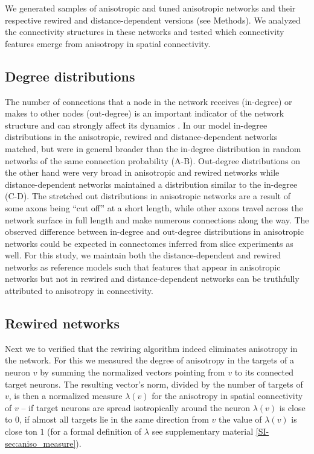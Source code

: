 
We generated samples of anisotropic and tuned anisotropic networks and
their respective rewired and distance-dependent versions (see
Methods). We analyzed the connectivity structures in these networks
and tested which connectivity features emerge from anisotropy in
spatial connectivity.

\subsection{Degree distributions}

The number of connections that a node in the network receives
(in-degree) or makes to other nodes (out-degree) is an important
indicator of the network structure and can strongly affect its
dynamics \cite{Roxin2011a, Martens2017}. In our model in-degree
distributions in the anisotropic, rewired and distance-dependent
networks matched, but were in general broader than the in-degree
distribution in random networks of the same connection probability
(A-B). Out-degree distributions on the other hand
were very broad in anisotropic and rewired networks while
distance-dependent networks maintained a distribution similar to the
in-degree (C-D). The stretched out distributions in
anisotropic networks are a result of some axons being \enquote{cut
  off} at a short length, while other axons travel across the network
surface in full length and make numerous connections along the
way. The observed difference between in-degree and out-degree
distributions in anisotropic networks could be expected in connectomes
inferred from slice experiments as well. For this study, we maintain
both the distance-dependent and rewired networks as reference models
such that features that appear in anisotropic networks but not in
rewired and distance-dependent networks can be truthfully attributed
to anisotropy in connectivity.



        
\subsection{Rewired networks}

Next we to verified that the rewiring algorithm indeed eliminates
anisotropy in the network. For this we measured the degree of
anisotropy in the targets of a neuron $v$ by summing the normalized
vectors pointing from $v$ to its connected target neurons. The
resulting vector's norm, divided by the number of targets of $v$, is
then a normalized measure $\lambda(v)$ for the anisotropy in spatial
connectivity of $v$ -- if target neurons are spread isotropically
around the neuron $\lambda(v)$ is close to $0$, if almost all targets
lie in the same direction from $v$ the value of $\lambda(v)$ is close
ton $1$ (for a formal definition of $\lambda$ see supplementary
material \ref{SI-sec:aniso_measure}).


